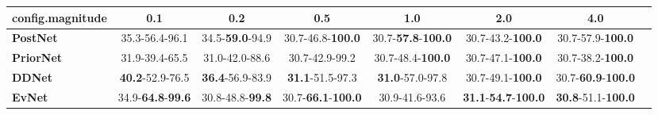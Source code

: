 \begin{tabular}{lccccccc}
\toprule
\textbf{config.magnitude} &                               0.1 &                      0.2 &                                0.5 &                                1.0 &                                         2.0 &                                4.0 \\
\midrule
\textbf{PostNet } &                    35.3-56.4-96.1 &  34.5-\textbf{59.0}-94.9 &           30.7-46.8-\textbf{100.0} &  30.7-\textbf{57.8}-\textbf{100.0} &                    30.7-43.2-\textbf{100.0} &           30.7-57.9-\textbf{100.0} \\
\textbf{PriorNet} &                    31.9-39.4-65.5 &           31.0-42.0-88.6 &                     30.7-42.9-99.2 &           30.7-48.4-\textbf{100.0} &                    30.7-47.1-\textbf{100.0} &           30.7-38.2-\textbf{100.0} \\
\textbf{DDNet   } &           \textbf{40.2}-52.9-76.5 &  \textbf{36.4}-56.9-83.9 &            \textbf{31.1}-51.5-97.3 &            \textbf{31.0}-57.0-97.8 &                    30.7-49.1-\textbf{100.0} &  30.7-\textbf{60.9}-\textbf{100.0} \\
\textbf{EvNet   } &  34.9-\textbf{64.8}-\textbf{99.6} &  30.8-48.8-\textbf{99.8} &  30.7-\textbf{66.1}-\textbf{100.0} &                     30.9-41.6-93.6 &  \textbf{31.1}-\textbf{54.7}-\textbf{100.0} &  \textbf{30.8}-51.1-\textbf{100.0} \\
\bottomrule
\end{tabular}
